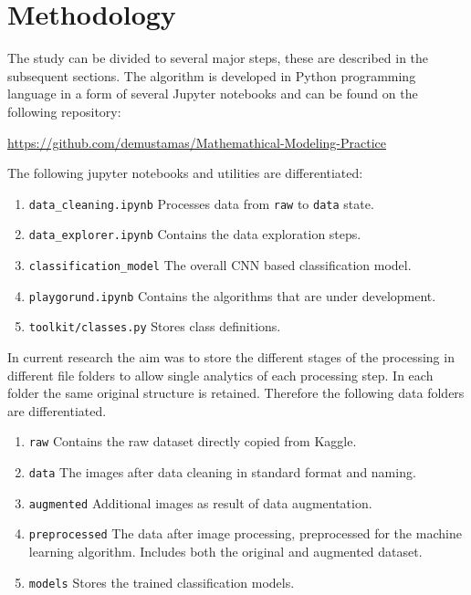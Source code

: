 \documentclass[10pt, final]{article}
\begin{document}
\section{Methodology} \label{sec:method}
The study can be divided to several major steps, these are described in the subsequent sections.
The algorithm is developed in Python programming language in a form of several Jupyter notebooks and can
be found on the following repository:

\noindent
\url{https://github.com/demustamas/Mathemathical-Modeling-Practice}

The following jupyter notebooks and utilities are differentiated:
\begin{enumerate}
	\item \lstinline{data_cleaning.ipynb} Processes data from \lstinline{raw} to \lstinline{data} state.
	\item \lstinline{data_explorer.ipynb} Contains the data exploration steps.
	\item \lstinline{classification_model} The overall CNN based classification model.
	\item \lstinline{playgorund.ipynb} Contains the algorithms that are under development.
	\item \lstinline{toolkit/classes.py} Stores class definitions.
\end{enumerate}

In current research the aim was to store the different stages of the processing in different file
folders to allow single analytics of each processing step.
In each folder the same original structure is retained.
Therefore the following data folders are differentiated.
\begin{enumerate}
	\item \lstinline{raw} Contains the raw dataset directly copied from Kaggle.
	\item \lstinline{data} The images after data cleaning in standard format and naming.
	\item \lstinline{augmented} Additional images as result of data augmentation.
	\item \lstinline{preprocessed} The data after image processing, preprocessed for the machine learning
	      algorithm. Includes both the original and augmented dataset.
	\item \lstinline{models} Stores the trained classification models.
\end{enumerate}
\end{document}
